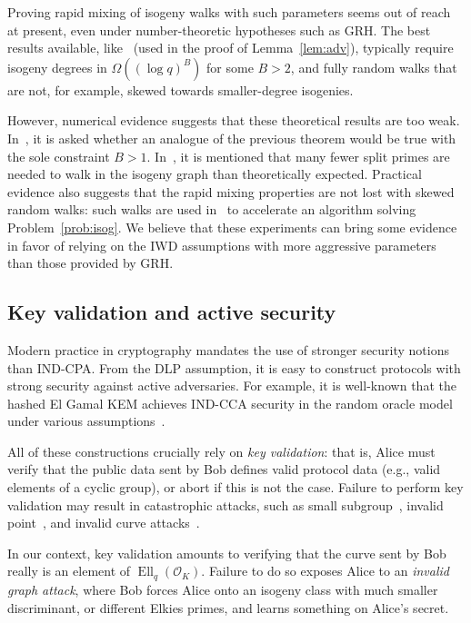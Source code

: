 \documentclass{llncs}
\renewcommand{\O}{\mathcal{O}}
\DeclareMathOperator{\Ell}{Ell}
\begin{document}
Proving rapid mixing of isogeny walks with such
parameters seems out of reach at present, even under number-theoretic
hypotheses such as GRH. The best results available,
like~\cite[Theorem~1.5]{jao+miller+venkatesan09}
(used in the proof of Lemma~\ref{lem:adv}),
typically require isogeny degrees in $\Omega((\log q)^B)$
for some $B>2$, and fully random walks that are not,
for example, skewed towards smaller-degree isogenies.

However, numerical evidence suggests that
these theoretical results are too weak. In~\cite[7.2]{jao+miller+venkatesan09},
it is asked whether an analogue of the previous theorem would
be true with the sole constraint $B>1$. In~\cite[Section~3]{GHS},
it is mentioned that many fewer split primes are needed to walk
in the isogeny graph than theoretically expected.
Practical evidence also suggests that the rapid mixing
properties are not lost with skewed random walks:
such walks are used in~\cite{galbraith+stolbunov11}
to accelerate an algorithm solving Problem~\ref{prob:isog}.
We believe that these experiments can bring some evidence
in favor of relying on the IWD assumptions with more aggressive
parameters than those provided by GRH.


\subsection{Key validation and active security}
\label{sec:validation}

Modern practice in cryptography mandates the use of stronger security
notions than IND-CPA.  From the DLP assumption, it is easy to
construct protocols with strong security against active adversaries.
For example, it is well-known that the hashed El Gamal KEM achieves
IND-CCA security in the random oracle model under various
assumptions~\cite{10.1007/3-540-45353-9_12,cryptoeprint:1999:007,doi:10.1137/S0097539702403773}.

All of these constructions crucially rely on \emph{key validation}:
that is, Alice must verify that the public data sent by Bob defines valid
protocol data (e.g., valid elements of a cyclic group), or abort if
this is not the case.
Failure to perform key validation may result in catastrophic attacks,
such as small subgroup~\cite{10.1007/BFb0052240}, invalid
point~\cite{10.1007/3-540-44598-6_8}, and invalid curve
attacks~\cite{Ciet2005}.  

In our context, key validation amounts to
verifying that the curve sent by Bob really is an element of
$\Ell_q(\O_K)$. Failure to do so exposes Alice to an \emph{invalid
  graph attack}, where Bob forces Alice onto an isogeny class with much
smaller discriminant, or different Elkies primes, and learns something
on Alice's secret.
\end{document}
